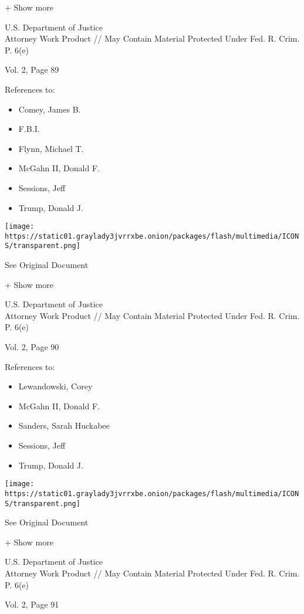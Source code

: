 + Show more

U.S. Department of Justice\\
Attorney Work Product // May Contain Material Protected Under Fed. R.
Crim. P. 6(e)

Vol. 2, Page 89

References to:

\begin{itemize}
\tightlist
\item
  Comey, James B.
\item
  F.B.I.
\item
  Flynn, Michael T.
\item
  McGahn II, Donald F.
\item
  Sessions, Jeff
\item
  Trump, Donald J.
\end{itemize}

\protect\hyperlink{}{}

\texttt{[image: https://static01.graylady3jvrrxbe.onion/packages/flash/multimedia/ICONS/transparent.png]}

See Original Document

+ Show more

U.S. Department of Justice\\
Attorney Work Product // May Contain Material Protected Under Fed. R.
Crim. P. 6(e)

Vol. 2, Page 90

References to:

\begin{itemize}
\tightlist
\item
  Lewandowski, Corey
\item
  McGahn II, Donald F.
\item
  Sanders, Sarah Huckabee
\item
  Sessions, Jeff
\item
  Trump, Donald J.
\end{itemize}

\protect\hyperlink{}{}

\texttt{[image: https://static01.graylady3jvrrxbe.onion/packages/flash/multimedia/ICONS/transparent.png]}

See Original Document

+ Show more

U.S. Department of Justice\\
Attorney Work Product // May Contain Material Protected Under Fed. R.
Crim. P. 6(e)

Vol. 2, Page 91

